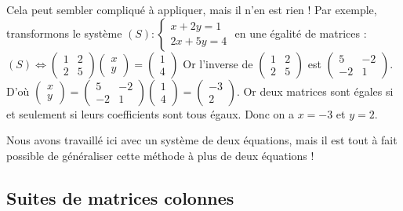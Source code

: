 	\begin{tip}[Exemple]
		Cela peut sembler compliqué à appliquer, mais il n'en est rien !
		\newpar
		Par exemple, transformons le système $\displaystyle{(S) : \begin{cases}x + 2y = 1 \\ 2x + 5y = 4 \end{cases}}$ en une égalité de matrices :
		\newpar
		$\displaystyle{(S) \iff \begin{pmatrix}1 & 2 \\ 2 & 5\end{pmatrix} \begin{pmatrix}x \\ y\end{pmatrix} = \begin{pmatrix}1 \\ 4 \end{pmatrix}}$
		\newpar
		Or l'inverse de $\displaystyle{\begin{pmatrix}1 & 2 \\ 2 & 5\end{pmatrix}}$ est $\displaystyle{\begin{pmatrix}5 & -2 \\ -2 & 1\end{pmatrix}}$. D'où $\displaystyle{\begin{pmatrix}x \\ y\end{pmatrix} = \begin{pmatrix}5 & -2 \\ -2 & 1\end{pmatrix} \begin{pmatrix}1 \\ 4\end{pmatrix} = \begin{pmatrix}-3 \\ 2\end{pmatrix}}$.
		\newpar
		Or deux matrices sont égales si et seulement si leurs coefficients sont tous égaux. Donc on a $x = -3$ et $y = 2$.
	\end{tip}
	
	Nous avons travaillé ici avec un système de deux équations, mais il est tout à fait possible de généraliser cette méthode à plus de deux équations !
	
	\subsection{Suites de matrices colonnes}
	
